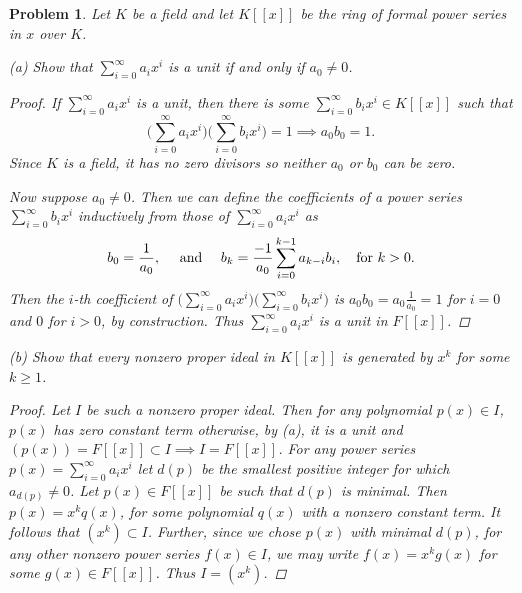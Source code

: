 \documentclass[11pt]{article}
\newcommand{\1}{\textbf{1}}
\newtheorem{prob}{Problem}
\begin{document}
\begin{prob}
Let $K$ be a field and let $K[[x]]$ be the ring of formal power series in $x$ over $K$.

\noindent (a) Show that $\sum_{i=0}^\infty a_i x^i$ is a unit if and only if $a_0 \neq 0$. 

\begin{proof}
If $\sum_{i=0}^\infty a_i x^i$ is a unit, then there is some $\sum_{i=0}^\infty b_i x^i\in K[[x]]$ such that \[\big(\sum_{i=0}^\infty a_i x^i\big)\big(\sum_{i=0}^\infty b_i x^i\big) = 1 \implies a_0 b_0 = 1. \] Since $K$ is a field, it has no zero divisors so neither $a_0$ or $b_0$ can be zero. 

Now suppose $a_0\neq 0$. Then we can define the coefficients of a power series $\sum_{i=0}^\infty b_i x^i$ inductively from those of $\sum_{i=0}^\infty a_i x^i$ as \[ b_0 = \frac{1}{a_0},\quad \textnormal{ and }\quad b_k = \frac{-1}{a_0}\sum_{i=0}^{k-1} a_{k-i} b_i,\quad\textnormal{for } k>0.\] Then the $i$-th coefficient of $\big(\sum_{i=0}^\infty a_i x^i\big)\big(\sum_{i=0}^\infty b_i x^i\big)$ is $a_0 b_0 = a_0\frac{1}{a_0} = 1$ for $i = 0$ and $0$ for $i>0$, by construction. Thus $\sum_{i=0}^\infty a_i x^i$ is a unit in $F[[x]]$. 
\end{proof}


\noindent (b) Show that every nonzero proper ideal in $K[[x]]$ is generated by $x^k$
for some $k \geq 1$.

\begin{proof}
Let $I$ be such a nonzero proper ideal. Then for any polynomial $p(x)\in I$, $p(x)$ has zero constant term otherwise, by (a), it is a unit and $(p(x)) = F[[x]]\subset I\implies I = F[[x]]$. For any power series $p(x) = \sum_{i=0}^\infty a_i x^i$ let $d(p)$ be the smallest positive integer for which $a_{d(p)} \neq 0$. Let $p(x)\in F[[x]]$ be such that $d(p)$ is minimal. Then $p(x) = x^k q(x)$, for some polynomial $q(x)$ with a nonzero constant term. It follows that $(x^k)\subset I$. Further, since we chose $p(x)$ with minimal $d(p)$, for any other nonzero power series $f(x) \in I$, we may write $f(x) = x^k g(x)$ for some $g(x)\in F[[x]]$. Thus $I = (x^k)$. 
\end{proof}
\end{prob}
\end{document}
